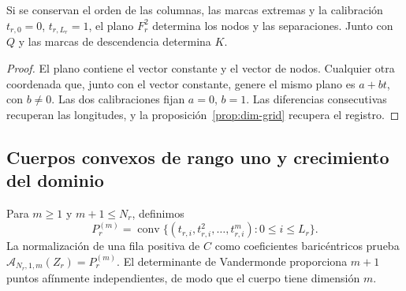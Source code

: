 \begin{proposition}
Si se conservan el orden de las columnas, las marcas extremas y la
calibración \(t_{r,0}=0\), \(t_{r,L_r}=1\), el plano \(F_r^2\)
determina los nodos y las separaciones. Junto con \(Q\) y las
marcas de descendencia determina \(K\).
\end{proposition}
\begin{proof}
El plano contiene el vector constante y el vector de nodos. Cualquier
otra coordenada que, junto con el vector constante, genere el mismo
plano es \(a+bt\), con \(b\neq0\). Las dos calibraciones fijan
\(a=0\), \(b=1\). Las diferencias consecutivas recuperan las
longitudes, y la proposición~\ref{prop:dim-grid} recupera el registro.
\end{proof}

\subsection{Cuerpos convexos de rango uno y crecimiento del dominio}

Para \(m\geq1\) y \(m+1\leq N_r\), definimos
\[
 P_r^{(m)}=\operatorname{conv}
 \{(t_{r,i},t_{r,i}^2,\ldots,t_{r,i}^m):0\leq i\leq L_r\}.
\]
La normalización de una fila positiva de \(C\) como coeficientes
baricéntricos prueba
\(\mathcal A_{N_r,1,m}(Z_r)=P_r^{(m)}\). El determinante de
Vandermonde proporciona \(m+1\) puntos afínmente independientes,
de modo que el cuerpo tiene dimensión \(m\).

